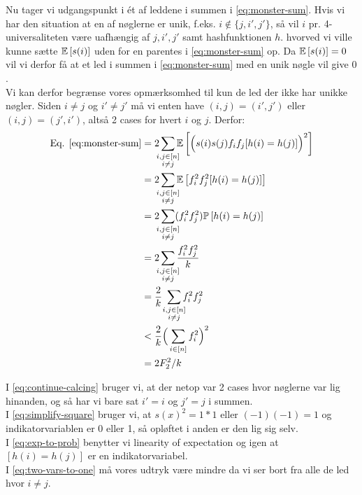 Nu tager vi udgangspunkt i ét af leddene i summen i \cref{eq:monster-sum}. Hvis vi har den situation at en af nøglerne er unik, f.eks. $i \notin \{j, i', j'\}$, så vil $i$ pr. 4-universaliteten være uafhængig af $j, i', j'$ samt hashfunktionen $h$. hvorved vi ville kunne sætte $\mathbb{E} \left[  s(i)  \right]$ uden for en parentes i \cref{eq:monster-sum} op. Da $\mathbb{E} \left[  s(i)  \right] = 0$ vil vi derfor få at et led i summen i \cref{eq:monster-sum} med en unik nøgle vil give $0$.\\

Vi kan derfor begrænse vores opmærksomhed til kun de led der ikke har unikke nøgler. Siden $i \neq j$ og $i' \neq j'$ må vi enten have $(i, j) = (i', j')$ eller $(i, j) = (j', i')$, altså 2 cases for hvert $i$ og $j$. Derfor:
\begin{align}
  \text{Eq. \cref{eq:monster-sum}}
  &= 2 \summ{i, j \in [n]\\ i \neq j} \E{\pBig{s(i) s(j) f_i f_j [h(i) = h(j)]}^2} \label{eq:continue-calcing} \\
  &= 2 \summ{i, j \in [n]\\ i \neq j} \E{f_i^2 f_j^2 [h(i) = h(j)]} \label{eq:simplify-square} \\
  &= 2 \summ{i, j \in [n]\\ i \neq j} (f_i^2 f_j^2) \P{h(i) = h(j)} \label{eq:exp-to-prob} \\
  &= 2 \summ{i, j \in [n]\\ i \neq j} \frac{f_i^2 f_j^2}{k} \nonumber \\
  &= \frac{2}{k} \ \summ{i, j \in [n]\\ i \neq j} f_i^2 f_j^2 \nonumber \\
  &< \frac{2}{k} \pBig{\sum_{i \in [n]} f_i^2}^2 \label{eq:two-vars-to-one} \\
  &= 2 F_2^2 / k \nonumber
\end{align}

I \cref{eq:continue-calcing} bruger vi, at der netop var 2 cases hvor nøglerne var lig hinanden, og så har vi bare sat $i' = i$ og $j' = j$ i summen.\\
I \cref{eq:simplify-square} bruger vi, at $s(x)^2 = 1*1$ eller $(-1)(-1) = 1$ og indikatorvariablen er 0 eller 1, så opløftet i anden er den lig sig selv.\\
I \cref{eq:exp-to-prob} benytter vi linearity of expectation og igen at $[h(i) = h(j)]$ er en indikatorvariabel.\\
I \cref{eq:two-vars-to-one} må vores udtryk være mindre da vi ser bort fra alle de led hvor $i \neq j$.

